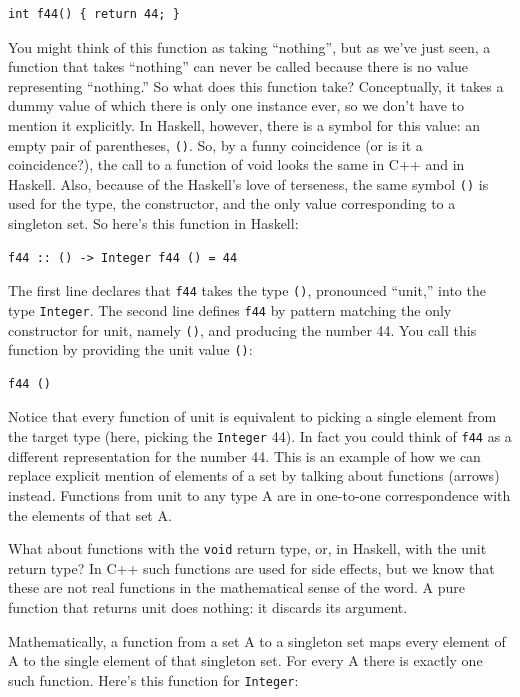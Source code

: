 \begin{verbatim}
int f44() { return 44; }
\end{verbatim}

You might think of this function as taking ``nothing'', but as we've
just seen, a function that takes ``nothing'' can never be called because
there is no value representing ``nothing.'' So what does this function
take? Conceptually, it takes a dummy value of which there is only one
instance ever, so we don't have to mention it explicitly. In Haskell,
however, there is a symbol for this value: an empty pair of parentheses,
\texttt{()}. So, by a funny coincidence (or is it a coincidence?), the
call to a function of void looks the same in C++ and in Haskell. Also,
because of the Haskell's love of terseness, the same symbol \texttt{()}
is used for the type, the constructor, and the only value corresponding
to a singleton set. So here's this function in Haskell:

\begin{verbatim}
f44 :: () -> Integer f44 () = 44
\end{verbatim}

The first line declares that \texttt{f44} takes the type \texttt{()},
pronounced ``unit,'' into the type \texttt{Integer}. The second line
defines \texttt{f44} by pattern matching the only constructor for unit,
namely \texttt{()}, and producing the number 44. You call this function
by providing the unit value \texttt{()}:

\begin{verbatim}
f44 ()
\end{verbatim}

Notice that every function of unit is equivalent to picking a single
element from the target type (here, picking the \texttt{Integer} 44). In
fact you could think of \texttt{f44} as a different representation for
the number 44. This is an example of how we can replace explicit mention
of elements of a set by talking about functions (arrows) instead.
Functions from unit to any type A are in one-to-one correspondence with
the elements of that set A.

What about functions with the \texttt{void} return type, or, in Haskell,
with the unit return type? In C++ such functions are used for side
effects, but we know that these are not real functions in the
mathematical sense of the word. A pure function that returns unit does
nothing: it discards its argument.

Mathematically, a function from a set A to a singleton set maps every
element of A to the single element of that singleton set. For every A
there is exactly one such function. Here's this function for
\texttt{Integer}:

